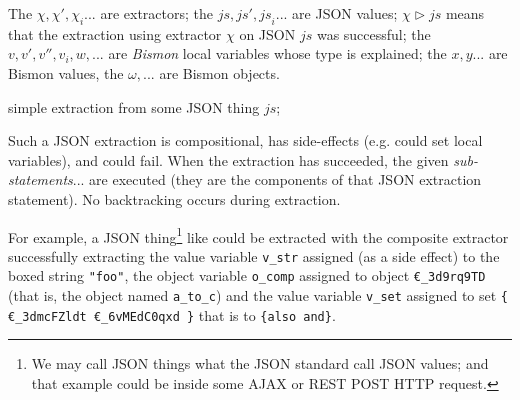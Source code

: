 \begin{table}
\begin{relsize}{-1.2}
\begin{minipage}{0.9\textwidth}
    The $\chi, \chi', \chi_i$... are extractors; the $\mathit{js},
    \mathit{js}', \mathit{js}_i$... are JSON values; $\chi
    \triangleright \mathit{js}$ means that the extraction using
    extractor $\chi$ on JSON $ \mathit{js}$ was successful; the $v,
    v', v'', v_i, w, $... are \emph{Bismon} local variables whose type
    is explained; the $x, y$... are Bismon values, the
    $\omega,$... are Bismon objects.
  \end{minipage}
  \end{relsize}
  \caption{simple extraction from some JSON thing $\mathit{js}$;
    {}
  }
  \label{tbl:extract-json-simple}
  \end{table}

Such a JSON extraction is compositional, has side-effects (e.g. could
set local variables), and could fail. When the extraction has
succeeded, the given \textit{sub-statements}... are executed (they are
the components of that JSON extraction statement). No backtracking
occurs during extraction.

For example, a JSON thing\footnote{We may call JSON things what the
  JSON standard call JSON values; and that example could be inside
  some AJAX or REST POST HTTP request.} like {} could be extracted with the composite extractor
{} successfully extracting
the value variable \texttt{v\_str} assigned (as a side effect) to the
boxed string \texttt{"foo"}, the object variable \texttt{o\_comp}
assigned to object \texttt{€\_3d9rq9TD} (that is, the object named
\texttt{a\_to\_c}) and the value variable \texttt{v\_set} assigned to
set \texttt{\{ €\_3dmcFZldt €\_6vMEdC0qxd \}} that is to
\texttt{\{also and\}}.


